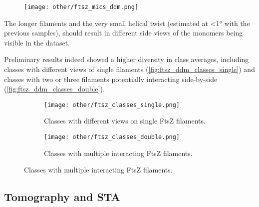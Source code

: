 \begin{figure}[ht]
    \centering
    \texttt{[image: other/ftsz\_mics\_ddm.png]}
    \label{fig:ftsz_ddm_mics}
\end{figure}

The longer filaments and the very small helical twist (estimated at <1° with the previous samples), should result in different side views of the monomers being visible in the dataset.

Preliminary results indeed showed a higher diversity in class averages, including classes with different views of single filaments (\autoref{fig:ftsz_ddm_classes_single}) and classes with two or three filaments potentially interacting side-by-side (\autoref{fig:ftsz_ddm_classes_double}).

\begin{figure}[ht]
    \centering
    \begin{subfigure}[B]{.5\textwidth}
        \centering
        \texttt{[image: other/ftsz\_classes\_single.png]}
        \caption{Classes with different views on single FtsZ filaments.}
        \label{fig:ftsz_ddm_classes_single}
    \end{subfigure}%
    \hfill
    \begin{subfigure}[B]{.5\textwidth}
        \centering
        \texttt{[image: other/ftsz\_classes\_double.png]}
        \caption{Classes with multiple interacting FtsZ filaments.}
        \label{fig:ftsz_ddm_classes_double}
    \end{subfigure}%
    \label{fig:ftsz_ddm_classes}
\end{figure}

\subsection{Tomography and STA}

